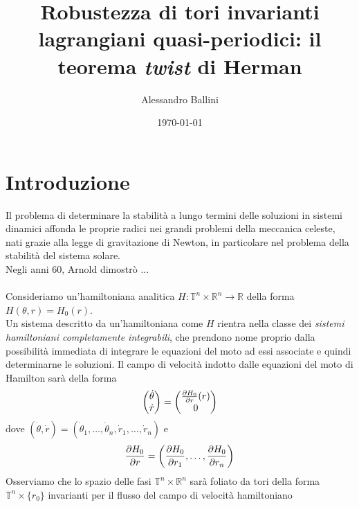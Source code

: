 \documentclass[twoside, 11pt]{amsbook}
\newcommand{\0}{{(0)}}
\newcommand{\3}{{(3)}}
\theoremstyle{colonplain}
\theoremstyle{colondefinition}
\theoremstyle{colonremark}
\numberwithin{equation}{chapter}
\begin{document}
\date{\today}
\author{Alessandro Ballini}


\title{Robustezza di tori invarianti lagrangiani quasi-periodici: il teorema \textit{twist} di Herman}

\maketitle
\tableofcontents

\chapter*{Introduzione}
Il problema di determinare la stabilità a lungo termini delle soluzioni in sistemi dinamici affonda le proprie radici nei grandi problemi della meccanica celeste, nati grazie alla legge di gravitazione di Newton, in particolare nel problema della stabilità del sistema solare. \\
Negli anni 60, Arnold dimostrò ... \\ \\
Consideriamo un'hamiltoniana analitica $H : \mathbb{T}^n \times \mathbb{R}^n \longrightarrow \mathbb{R}$ della forma $H(\theta, r) = H_0(r)$. \\
Un sistema descritto da un'hamiltoniana come $H$ rientra nella classe dei \textit{sistemi hamiltoniani completamente integrabili}, che prendono nome proprio dalla possibilità immediata di integrare le equazioni del moto ad essi associate e quindi determinarne le soluzioni. Il campo di velocità indotto dalle equazioni del moto di Hamilton sarà della forma
\begin{align}
    \begin{pmatrix}
        \dot{\theta} \\
        \dot{r}
    \end{pmatrix} = \begin{pmatrix}
        \frac{\partial H_0}{\partial r}(r) \\
        0
    \end{pmatrix} \notag
\end{align}
dove $(\dot{\theta}, \dot{r}) = (\dot{\theta}_1, \dots, \dot{\theta}_n, \dot{r}_1, \dots, \dot{r}_n)$ e
\begin{align}
    \frac{\partial H_0}{\partial r} = \left(\frac{\partial H_0}{\partial r_1}, \dots, \frac{\partial H_0}{\partial r_n}\right) \notag
\end{align}
Osserviamo che lo spazio delle fasi $\mathbb{T}^n \times \mathbb{R}^n$ sarà foliato da tori della forma $\mathbb{T}^n \times \{r_0\}$ invarianti per il flusso del campo di velocità hamiltoniano
\end{document}
